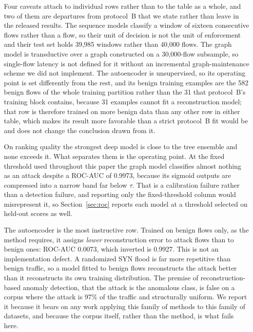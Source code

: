\documentclass{ieeeaccess}
\begin{document}
Four caveats attach to individual rows rather than to the table as a whole, and
two of them are departures from protocol~B that we state rather than leave in the
released results. The sequence models classify a window of sixteen consecutive
flows rather than a flow, so their unit of decision is not the unit of
enforcement and their test set holds 39,985 windows rather than 40,000 flows. The
graph model is transductive over a graph constructed on a 30,000-flow subsample,
so single-flow latency is not defined for it without an incremental
graph-maintenance scheme we did not implement. The autoencoder is unsupervised,
so its operating point is set differently from the rest, and its benign training
examples are the 582 benign flows of the whole training partition rather than the
31 that protocol~B's training block contains, because 31 examples cannot fit a
reconstruction model; that row is therefore trained on more benign data than any
other row in either table, which makes its result more favorable than a strict
protocol~B fit would be and does not change the conclusion drawn from it.

On ranking quality the strongest deep model is close to the tree ensemble and
none exceeds it. What separates them is the operating point. At the fixed
threshold used throughout this paper the graph model classifies almost nothing as
an attack despite a ROC-AUC of 0.9973, because its sigmoid outputs are compressed
into a narrow band far below $\tau$. That is a calibration failure rather than a
detection failure, and reporting only the fixed-threshold column would misrepresent
it, so Section~\ref{sec:roc} reports each model at a threshold selected on held-out
scores as well.

The autoencoder is the most instructive row. Trained on benign flows only, as the
method requires, it assigns \emph{lower} reconstruction error to attack flows than
to benign ones: ROC-AUC 0.0073, which inverted is 0.9927. This is not an
implementation defect. A randomized SYN flood is far more repetitive than benign
traffic, so a model fitted to benign flows reconstructs the attack better than it
reconstructs its own training distribution. The premise of reconstruction-based
anomaly detection, that the attack is the anomalous class, is false on a corpus
where the attack is 97\% of the traffic and structurally uniform. We report it
because it bears on any work applying this family of methods to this family of
datasets, and because the corpus itself, rather than the method, is what fails
here.
\end{document}
